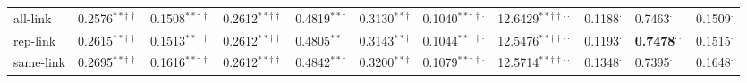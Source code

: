 \begin{tabular}{lllllllllll}
all-link         &            0.2576$^{**\dagger\dagger}$ &            0.1508$^{**\dagger\dagger}$ &            0.2612$^{**\dagger\dagger}$ &                   0.4819$^{**\dagger}$ &                   0.3130$^{**\dagger}$ &       0.1040$^{**\dagger\dagger\cdot}$ &           12.6429$^{**\dagger\dagger\cdot\cdot}$ &                       0.1188$^{\cdot}$ &                  0.7463$^{\cdot\cdot}$ &                       0.1509$^{\cdot}$ \\
rep-link         &            0.2615$^{**\dagger\dagger}$ &            0.1513$^{**\dagger\dagger}$ &            0.2612$^{**\dagger\dagger}$ &                   0.4805$^{**\dagger}$ &                   0.3143$^{**\dagger}$ &       0.1044$^{**\dagger\dagger\cdot}$ &           12.5476$^{**\dagger\dagger\cdot\cdot}$ &                       0.1193$^{\cdot}$ &         \textbf{0.7478}$^{\cdot\cdot}$ &                       0.1515$^{\cdot}$ \\
same-link        &            0.2695$^{**\dagger\dagger}$ &            0.1616$^{**\dagger\dagger}$ &            0.2612$^{**\dagger\dagger}$ &                   0.4842$^{**\dagger}$ &                   0.3200$^{**\dagger}$ &       0.1079$^{**\dagger\dagger\cdot}$ &           12.5714$^{**\dagger\dagger\cdot\cdot}$ &                       0.1348$^{\cdot}$ &                  0.7395$^{\cdot\cdot}$ &                       0.1648$^{\cdot}$ \\
\bottomrule
\end{tabular}
